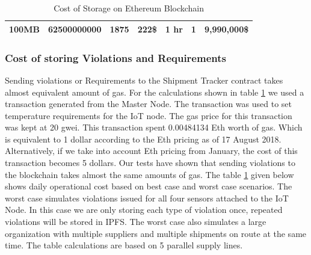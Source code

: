 \begin{table}[h]
{\begin{tabular}{|c|c|c|c|c|c|c|}
\textbf{100MB}                                                                & 62500000000                                  & 1875                                                                                             & \multirow{-4}{*}{222\$}                    & \multirow{-4}{*}{1 hr}                                                                & \multirow{-4}{*}{1}                                                                  & 9,990,000\$                                                                                                                                          \\ \hline
\end{tabular}%
}
\caption {Cost of Storage on Ethereum Blockchain}
\label{table:t4}
\end{table}

\subsubsection{Cost of storing Violations and Requirements}
Sending violations or Requirements to the Shipment Tracker contract takes almost equivalent amount of gas. For the calculations shown in table \ref{table:t4} we used a transaction generated from the Master Node. The transaction was used to set temperature requirements for the IoT node. The gas price for this transaction was kept at 20 gwei. This transaction spent 0.00484134 Eth worth of gas. Which is equivalent to 1 dollar according to the Eth pricing as of 17 August 2018. Alternatively, if we take into account Eth pricing from January, the cost of this transaction becomes 5 dollars.  Our tests have shown that sending violations to the blockchain takes almost the same amounts of gas. The table \ref{table:t4} given below shows daily operational cost based on best case and worst case scenarios. The worst case simulates violations issued for all four sensors attached to the IoT Node. In this case we are only storing each type of violation once, repeated violations will be stored in IPFS. The worst case also simulates a large organization with multiple suppliers and multiple shipments on route at the same time. The table calculations are based on 5 parallel supply lines.

